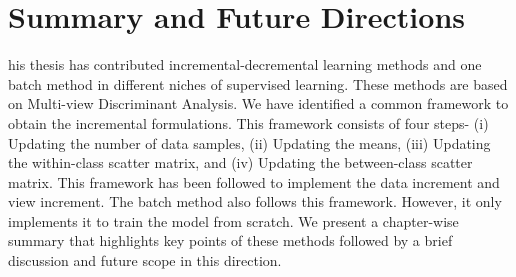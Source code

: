 \chapter{Summary and Future Directions}
\label{ch:Conc}
his thesis has contributed incremental-decremental learning methods and one batch method in different niches of supervised learning. These methods are based on Multi-view Discriminant Analysis. We have identified a common framework to obtain the incremental formulations. This framework consists of four steps- (i) Updating the number of data samples, (ii) Updating the means, (iii) Updating the within-class scatter matrix, and (iv) Updating the between-class scatter matrix. This framework has been followed to implement the data increment and view increment. The batch method also follows this framework. However, it only implements it to train the model from scratch. We present a chapter-wise summary that highlights key points of these methods followed by a brief discussion and future scope in this direction.









